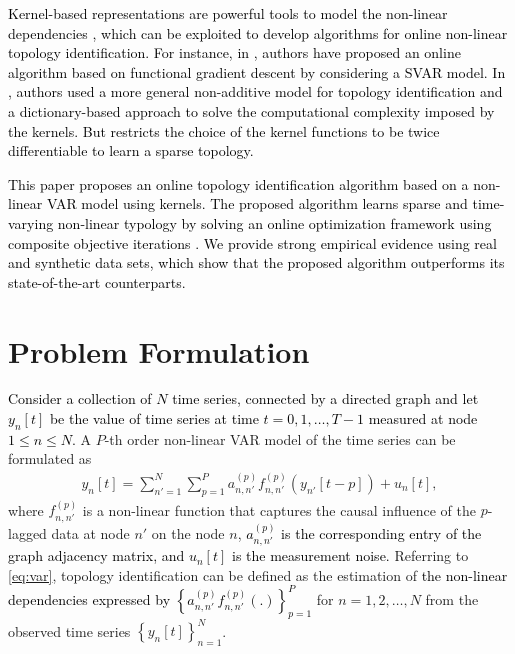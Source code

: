 \documentclass[conference]{IEEEtran}
\def\cbr#1{\left\lbrace #1 \right\rbrace}
\newcommand{\cB}[1]{\textcolor{black}{#1}}
\def\p {{(p)}}
\def\n {{n'}}
\begin{document}
\cB{Kernel-based representations are powerful tools to model the non-linear dependencies \cite{leasch2001}, which can be exploited to develop algorithms for online non-linear topology identification. For instance, in \cite{only.s2018}, authors have proposed an online algorithm based on functional gradient descent by considering a SVAR model. In \cite{onlm.m2020}, authors used a more general non-additive model for topology identification and a dictionary-based approach to solve the computational complexity imposed by the kernels. But \cite{onlm.m2020} restricts the choice of the kernel functions to be twice differentiable to learn a sparse topology.}

\cB{This paper proposes an online topology identification algorithm based on a non-linear VAR model using kernels. The proposed algorithm learns sparse and time-varying non-linear typology by solving an online optimization framework using composite objective iterations \cite{Comjoh2010}. We provide strong empirical evidence using real and synthetic data sets, which show that the proposed algorithm outperforms its state-of-the-art counterparts.}




\section{Problem Formulation}
\cB{Consider a collection of $N$ time series, connected by a directed graph and let $y_n[t]$ be the value of time series at time $t=0,1,\dots,T-1$ measured at node $1\leq n\leq N$.}
A $P$-th order non-linear VAR model of the time series can be formulated as
	\begin{align} \label{eq:var}
	y_n[t] =   \sum_{\n = 1}^{N} \sum_{p = 1}^{P}a_{n,\n}^{\p} f_{n,n'}^{(p)}(y_{\n}[t-p])+u_n[t],
	\end{align}
where $f_{n,n'}^{(p)}$ is a non-linear function that captures the causal influence of the $p$-lagged data at node $\n$ on the node $n$, \cB{$a_{n,\n}^{(p)}$ is the corresponding entry of the graph adjacency matrix, and $u_n[t]$ is the measurement noise.} Referring to \eqref{eq:var}, topology identification can be defined as the estimation of \cB{the non-linear dependencies expressed by $\cbr{a_{n,\n}^{\p}f_{n,n'}^{(p)}(.)}_{p=1}^P$} for $n=1,2,\dots,N$ from the observed time series $\cbr{y_n[t]}_{n=1}^N$.
\end{document}
